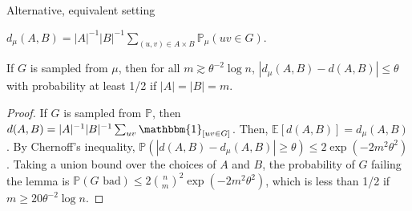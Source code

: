 \documentclass{beamer}
\newcommand{\1}{\mathbbm{1}}
\newcommand{\indicator}[1]{\1_{[#1]}}
\newcommand{\Exp}[1]{\mathbb{E}\left [#1 \right ]}
\newcommand{\Prob}{\mathbb{P}}
\begin{document}
\begin{frame}{Alternative, equivalent setting}
  \begin{definition}
    $d_\mu(A, B) = |A|^{-1} |B|^{-1} \sum_{(u, v) \in A \times B} \Prob_\mu(uv \in G)$.
  \end{definition}

  \pause

  \begin{lemma}
    If $G$ is sampled from $\mu$, then for all $m \gtrsim \theta^{-2} \log n$, $|d_\mu(A,
      B) - d(A, B)| \le \theta$ with probability at least 1/2 if $|A| = |B| = m$.
  \end{lemma}

  \pause

  \begin{proof}
    \pause
    If $G$ is sampled from $\Prob$, then $d(A, B) = |A|^{-1} |B|^{-1} \sum_{uv}
      \indicator{uv \in G}$.
    \pause
    Then, $\Exp{d(A, B)} = d_\mu(A, B)$.
    \pause
    By Chernoff's inequality, $\Prob(|d(A, B) - d_\mu(A, B)| \ge \theta) \le 2\exp(-2
      m^2 \theta^2)$.
    \pause
    Taking a union bound over the choices of $A$ and $B$, the probability of $G$
    failing the lemma is $\Prob(G \text{ bad}) \le 2 {n \choose m}^2 \exp(-2 m^2
      \theta^2)$,
    \pause
    which is less than 1/2 if $m \ge 20 \theta^{-2} \log n$.
  \end{proof}
\end{frame}
\end{document}
